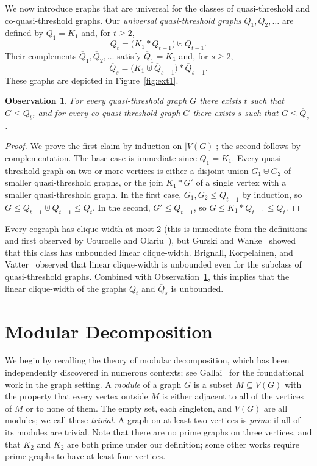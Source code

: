 \documentclass[10pt]{article}
\theoremstyle{plain}
\newtheorem{observation}[theorem]{Observation}
\begin{document}
We now introduce graphs that are universal for the classes of quasi-threshold and co-quasi-threshold graphs. Our \emph{universal quasi-threshold graphs} $Q_1, Q_2, \dotsc$ are defined by $Q_1=K_1$ and, for $t\ge 2$,
\[
	Q_t = \bigl(K_1\ast Q_{t-1}\bigr)\uplus Q_{t-1}.
\]
Their complements $\overline{Q}_1, \overline{Q}_2, \dotsc$ satisfy $\overline{Q}_1 = K_1$ and, for $s\ge 2$,
\[
	\overline{Q}_s
	= \bigl(K_1\uplus \overline{Q}_{s-1}\bigr)\ast \overline{Q}_{s-1}.
\]
These graphs are depicted in Figure~\ref{fig:ext1}.

\begin{observation}
\label{obs:universal}
For every quasi-threshold graph $G$ there exists $t$ such that $G\le Q_t$, and for every co-quasi-threshold graph $G$ there exists $s$ such that $G\le \overline{Q}_s$.
\end{observation}
\begin{proof}
We prove the first claim by induction on $|V(G)|$; the second follows by complementation. The base case is immediate since $Q_1=K_1$. Every quasi-threshold graph on two or more vertices is either a disjoint union $G_1\uplus G_2$ of smaller quasi-threshold graphs, or the join $K_1\ast G'$ of a single vertex with a smaller quasi-threshold graph. In the first case, $G_1, G_2 \le Q_{t-1}$ by induction, so $G\le Q_{t-1}\uplus Q_{t-1}\le Q_t$. In the second, $G'\le Q_{t-1}$, so $G\le K_1\ast Q_{t-1}\le Q_t$.
\end{proof}

Every cograph has clique-width at most $2$ (this is immediate from the definitions and first observed by Courcelle and Olariu~\cite{courcelle:upper-bounds-to:}), but Gurski and Wanke~\cite{gurski:on-the-relation:} showed that this class has unbounded linear clique-width. Brignall, Korpelainen, and Vatter~\cite{brignall:linear-clique-w:} observed that linear clique-width is unbounded even for the subclass of quasi-threshold graphs. Combined with Observation~\ref{obs:universal}, this implies that the linear clique-width of the graphs $Q_t$ and $\overline{Q}_s$ is unbounded.

%
%
%
%
%

\section{Modular Decomposition}
\label{sec-mod-decomp}

We begin by recalling the theory of modular decomposition, which has been independently discovered in numerous contexts; see Gallai~\cite{gallai:transitiv-orien:,gallai:a-translation-o:} for the foundational work in the graph setting. A \emph{module} of a graph $G$ is a subset $M\subseteq V(G)$ with the property that every vertex outside $M$ is either adjacent to all of the vertices of $M$ or to none of them. The empty set, each singleton, and $V(G)$ are all modules; we call these \emph{trivial}. A graph on at least two vertices is \emph{prime} if all of its modules are trivial. Note that there are no prime graphs on three vertices, and that $K_2$ and $\overline{K}_2$ are both prime under our definition; some other works require prime graphs to have at least four vertices.
\end{document}
